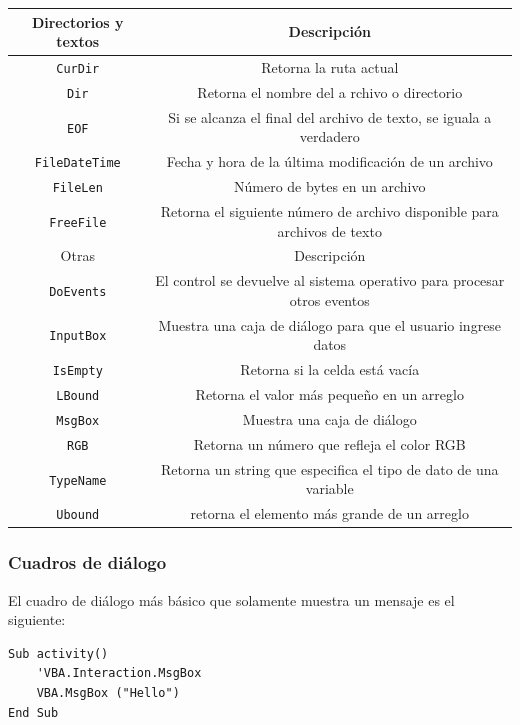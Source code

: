 \begin{table}[H]
    \centering
    \begin{tabular}{c|c}
       \rowcolor{micolor1} Directorios y textos & Descripción \\ \hline
       \texttt{ CurDir } & Retorna la ruta actual\\
       \texttt{ Dir } & Retorna el nombre del a rchivo o directorio \\
       \texttt{ EOF } & Si se alcanza el final del archivo de texto, se iguala a verdadero \\
       \texttt{ FileDateTime } & Fecha y hora de la última modificación de un archivo\\
       \texttt{ FileLen } & Número de bytes en un archivo\\
       \texttt{ FreeFile } & Retorna el siguiente número de archivo disponible para archivos de texto  \\
       \rowcolor{micolor1} Otras & Descripción \\ \hline
       \texttt{ DoEvents } & El control se devuelve al sistema operativo para procesar otros eventos\\
       \texttt{ InputBox } & Muestra una caja de diálogo para que el usuario ingrese datos\\
       \texttt{ IsEmpty } & Retorna si la celda está vacía\\
       \texttt{ LBound } & Retorna el valor más pequeño en un arreglo\\
       \texttt{ MsgBox } & Muestra una caja de diálogo\\
       \texttt{ RGB } & Retorna un número que refleja el color RGB \\
       \texttt{ TypeName } & Retorna un string que especifica el tipo de dato de una variable\\
       \texttt{ Ubound } & retorna el elemento más grande de un arreglo \\
    \end{tabular}
\end{table}

\subsubsection{Cuadros de diálogo}

El cuadro de diálogo más básico que solamente muestra un mensaje es el siguiente:

\begin{verbatim}
Sub activity()
    'VBA.Interaction.MsgBox
    VBA.MsgBox ("Hello")
End Sub
\end{verbatim}

